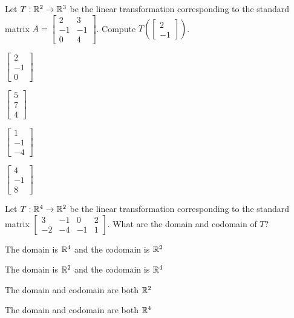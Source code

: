 \begin{readinessAssuranceTest}
\item Let $T: \mathbb{R}^2 \rightarrow \mathbb{R}^3$ be the linear transformation corresponding to the standard matrix $A=\begin{bmatrix} 2 & 3 \\ -1 & -1 \\ 0 & 4 \end{bmatrix}$.  Compute $T\left(\begin{bmatrix} 2 \\ -1 \end{bmatrix}\right)$.
\begin{multicols}{4}
\begin{readinessAssuranceTestChoices}
\item $\begin{bmatrix} 2 \\ -1 \\ 0 \end{bmatrix}$
\item $\begin{bmatrix} 5 \\ 7 \\ 4\end{bmatrix}$
\item $\begin{bmatrix} 1 \\ -1 \\ -4 \end{bmatrix}$ %
\item $\begin{bmatrix} 4 \\ -1 \\ 8 \end{bmatrix}$
\end{readinessAssuranceTestChoices}
\end{multicols}

\newpage
\item Let \(T: \mathbb{R}^4 \rightarrow \mathbb{R}^2\) be the linear transformation corresponding to the standard matrix \(\begin{bmatrix} 3 & -1 & 0 & 2 \\ -2 & -4 & -1 & 1 \end{bmatrix} \).  What are the domain and codomain of \(T\)?
\begin{readinessAssuranceTestChoices}
\item The domain is \(\mathbb{R}^4\) and the codomain is \(\mathbb{R}^2\)
\item The domain is \(\mathbb{R}^2\) and the codomain is \(\mathbb{R}^4\)
\item The domain and codomain are both \(\mathbb{R}^2\)
\item The domain and codomain are both \(\mathbb{R}^4\)
\end{readinessAssuranceTestChoices}


\end{readinessAssuranceTest}

